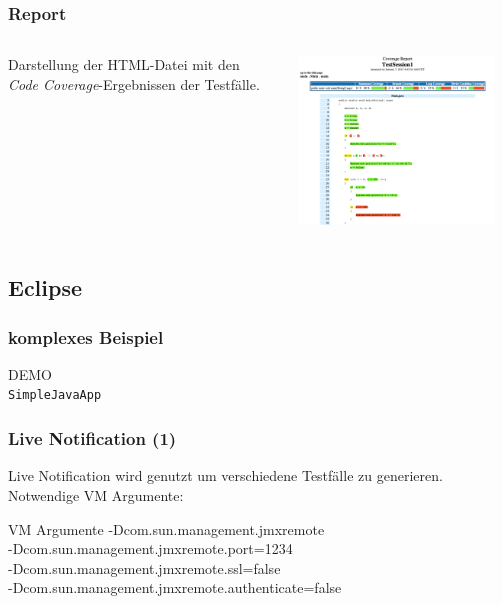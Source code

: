 \documentclass{beamer}
\begin{document}
  \begin{frame}\frametitle{Report}
    \begin{columns}
      \begin{column}{5cm}
        Darstellung der HTML-Datei mit den\\
        \textit{Code Coverage}-Ergebnissen der Testfälle.
        \vspace{1cm}
      \end{column}
      \begin{column}{5cm}
        \begin{overprint}
          \includegraphics[height=45mm]{pictures/demo_commandline/06_report_html.png}
        \end{overprint}
      \end{column}
    \end{columns}
  \end{frame}

  \subsection{Eclipse}
  \begin{frame}\frametitle{komplexes Beispiel}
    \centering
    \Huge{DEMO}\\
    \centering
    \normalsize{\texttt{SimpleJavaApp}}\\
  \end{frame}

  \begin{frame}\frametitle{Live Notification (1)}
    Live Notification wird genutzt um verschiedene Testfälle zu generieren.\\
    Notwendige VM Argumente:
    \begin{block}{VM Argumente}
      -Dcom.sun.management.jmxremote \\
      -Dcom.sun.management.jmxremote.port=1234 \\
      -Dcom.sun.management.jmxremote.ssl=false \\
      -Dcom.sun.management.jmxremote.authenticate=false
    \end{block}
  \end{frame}
\end{document}
